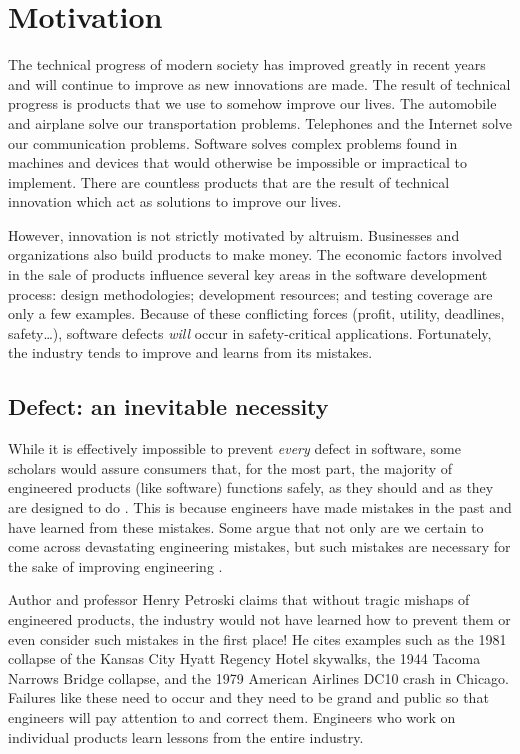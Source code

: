 \documentclass[12pt]{report}
\begin{document}
\chapter{Motivation} 

The technical progress of modern society has improved greatly in recent years and will continue to improve as new innovations are made. The result of technical progress is products that we use to somehow improve our lives. The automobile and airplane solve our transportation problems. Telephones and the Internet solve our communication problems. Software solves complex problems found in machines and devices that would otherwise be impossible or impractical to implement. There are countless products that are the result of technical innovation which act as solutions to improve our lives. 

However, innovation is not strictly motivated by altruism. Businesses and organizations also build products to make money. The economic factors involved in the sale of products influence several key areas in the software development process: design methodologies; development resources; and testing coverage are only a few examples. Because of these conflicting forces (profit, utility, deadlines, safety\ldots), software defects \textit{will} occur in safety-critical applications. Fortunately, the industry tends to improve and learns from its mistakes. 

\section{Defect: an inevitable necessity} 
While it is effectively impossible to prevent \textit{every} defect in software, some scholars would assure consumers that, for the most part, the majority of engineered products (like software) functions safely, as they should and as they are designed to do \cite{Petroski85}. This is because engineers have made mistakes in the past and have learned from these mistakes. Some argue that not only are we certain to come across devastating engineering mistakes, but such mistakes are necessary for the sake of improving engineering \cite{Petroski85}. 

Author and professor Henry Petroski claims that without tragic mishaps of engineered products, the industry would not have learned how to prevent them or even consider such mistakes in the first place! He cites examples such as the 1981 collapse of the Kansas City Hyatt Regency Hotel skywalks, the 1944 Tacoma Narrows Bridge collapse, and the 1979 American Airlines DC10 crash in Chicago. Failures like these need to occur and they need to be grand and public so that engineers will pay attention to and correct them. Engineers who work on individual products learn lessons from the entire industry.
\end{document}
